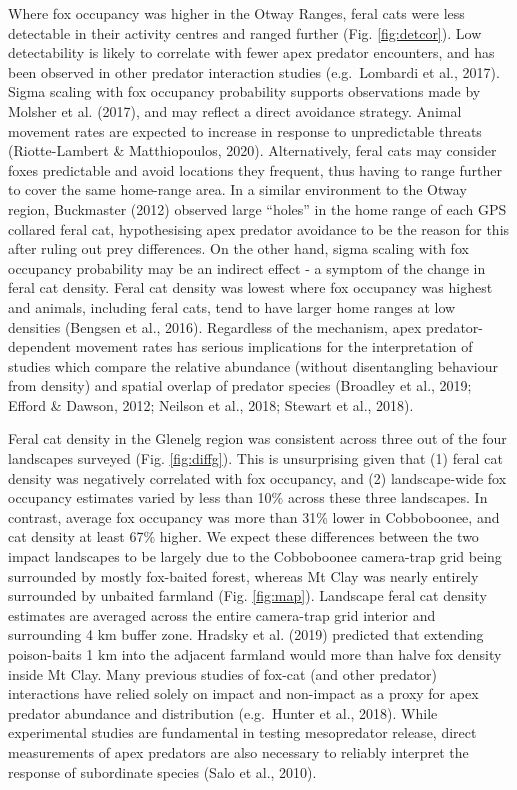 \documentclass[]{elsarticle} %
\begin{document}
Where fox occupancy was higher in the Otway Ranges, feral cats were less detectable in their activity centres and ranged further (Fig. \ref{fig:detcor}). Low detectability is likely to correlate with fewer apex predator encounters, and has been observed in other predator interaction studies (e.g.~Lombardi et al., 2017). Sigma scaling with fox occupancy probability supports observations made by Molsher et al. (2017), and may reflect a direct avoidance strategy. Animal movement rates are expected to increase in response to unpredictable threats (Riotte-Lambert \& Matthiopoulos, 2020). Alternatively, feral cats may consider foxes predictable and avoid locations they frequent, thus having to range further to cover the same home-range area. In a similar environment to the Otway region, Buckmaster (2012) observed large ``holes'' in the home range of each GPS collared feral cat, hypothesising apex predator avoidance to be the reason for this after ruling out prey differences. On the other hand, sigma scaling with fox occupancy probability may be an indirect effect - a symptom of the change in feral cat density. Feral cat density was lowest where fox occupancy was highest and animals, including feral cats, tend to have larger home ranges at low densities (Bengsen et al., 2016). Regardless of the mechanism, apex predator-dependent movement rates has serious implications for the interpretation of studies which compare the relative abundance (without disentangling behaviour from density) and spatial overlap of predator species (Broadley et al., 2019; Efford \& Dawson, 2012; Neilson et al., 2018; Stewart et al., 2018).

Feral cat density in the Glenelg region was consistent across three out of the four landscapes surveyed (Fig. \ref{fig:diffg}). This is unsurprising given that (1) feral cat density was negatively correlated with fox occupancy, and (2) landscape-wide fox occupancy estimates varied by less than 10\% across these three landscapes. In contrast, average fox occupancy was more than 31\% lower in Cobboboonee, and cat density at least 67\% higher. We expect these differences between the two impact landscapes to be largely due to the Cobboboonee camera-trap grid being surrounded by mostly fox-baited forest, whereas Mt Clay was nearly entirely surrounded by unbaited farmland (Fig. \ref{fig:map}). Landscape feral cat density estimates are averaged across the entire camera-trap grid interior and surrounding 4 km buffer zone. Hradsky et al. (2019) predicted that extending poison-baits 1 km into the adjacent farmland would more than halve fox density inside Mt Clay. Many previous studies of fox-cat (and other predator) interactions have relied solely on impact and non-impact as a proxy for apex predator abundance and distribution (e.g.~Hunter et al., 2018). While experimental studies are fundamental in testing mesopredator release, direct measurements of apex predators are also necessary to reliably interpret the response of subordinate species (Salo et al., 2010).
\end{document}
